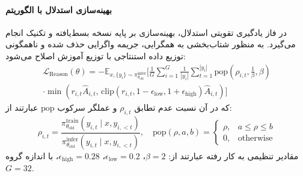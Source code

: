 \paragraph*{بهینه‌سازی استدلال با الگوریتم }
در فاز یادگیری تقویتی استدلال، بهینه‌سازی بر پایه نسخه بسط‌یافته  \cite{shao2024deepseekmath} و تکنیک  \cite{zhao2025small} انجام می‌گیرد. به منظور شتاب‌بخشی به همگرایی، جریمه واگرایی  حذف شده و ناهمگونی توزیع داده استنتاجی با توزیع آموزش اصلاح می‌شود:
\begin{equation}
\begin{split}
    \mathcal{L}_{\text{Reason}}(\theta) = -\mathbb{E}_{x, \{y_i\} \sim \pi_{\theta_{\text{old}}}^{\text{infer}}} \Bigg[ \frac{1}{G} \sum_{i=1}^G \frac{1}{|y_i|} \sum_{t=1}^{|y_i|} \text{pop}\left(\rho_{i,t}, \frac{1}{\beta}, \beta\right) \\
    \cdot \min\left(r_{i,t}\hat{A}_{i,t}, \, \text{clip}(r_{i,t}, 1 - \epsilon_{\text{low}}, 1 + \epsilon_{\text{high}})\hat{A}_{i,t}\right) \Bigg]
\end{split}
\end{equation}
که در آن نسبت عدم تطابق $\rho_{i,t}$ و عملگر سرکوب $\text{pop}$ عبارتند از:
\begin{equation}
    \rho_{i,t} = \frac{\pi_{\theta_{\text{old}}}^{\text{train}}(y_{i,t} \mid x, y_{i,<t})}{\pi_{\theta_{\text{old}}}^{\text{infer}}(y_{i,t} \mid x, y_{i,<t})}, \quad \text{pop}(\rho, a, b) = \begin{cases} \rho, & a \le \rho \le b \\ 0, & \text{otherwise} \end{cases}
\end{equation}
مقادیر تنظیمی به کار رفته عبارتند از: $\beta = 2$، $\epsilon_{\text{low}} = 0.2$، $\epsilon_{\text{high}} = 0.28$، با اندازه گروه $G = 32$.

